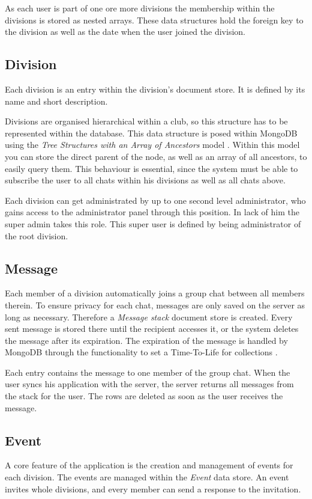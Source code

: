 As each user is part of one ore more divisions the membership within the divisions is stored as nested arrays. These data structures hold the foreign key to the division as well as the date when the user joined the division.

\subsection{Division}
Each division is an entry within the division's document store. It is defined by its name and short description.

Divisions are organised hierarchical within a club, so this structure has to be represented within the database. This data structure is posed within MongoDB using the \emph{Tree Structures with an Array of Ancestors} model \cite[p. 149]{Mongo:2014aa}. Within this model you can store the direct parent of the node, as well as an array of all ancestors, to easily query them. This behaviour is essential, since the system must be able to subscribe the user to all chats within his divisions as well as all chats above.

Each division can get administrated by up to one second level administrator, who gains access to the administrator panel through this position. In lack of him the super admin takes this role. This super user is defined by being administrator of the root division.

\subsection{Message}
Each member of a division automatically joins a group chat between all members therein. To ensure privacy for each chat, messages are only saved on the server as long as necessary. Therefore a \emph{Message stack} document store is created. Every sent message is stored there until the recipient accesses it, or the system deletes the message after its expiration. The expiration of the message is handled by MongoDB through the functionality to set a Time-To-Life for collections \cite[p. 198]{Mongo:2014aa}.

Each entry contains the message to one member of the group chat. When the user syncs his application with the server, the server returns all messages from the stack for the user. The rows are deleted as soon as the user receives the message. 

\subsection{Event}
A core feature of the application is the creation and management of events for each division. The events are managed within the \emph{Event} data store. An event invites whole divisions, and every member can send a response to the invitation. 

